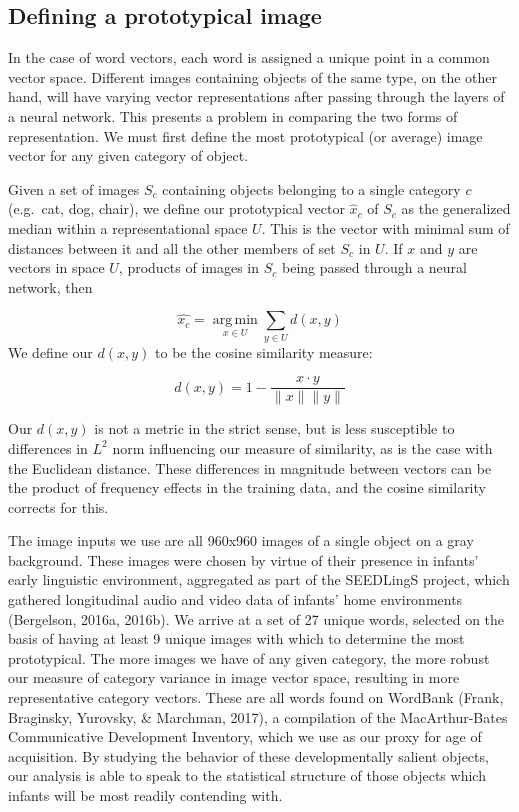 \documentclass[10pt, letterpaper]{article}
\begin{document}
\subsection{Defining a prototypical
image}\label{defining-a-prototypical-image}

In the case of word vectors, each word is assigned a unique point in a
common vector space. Different images containing objects of the same
type, on the other hand, will have varying vector representations after
passing through the layers of a neural network. This presents a problem
in comparing the two forms of representation. We must first define the
most prototypical (or average) image vector for any given category of
object.

Given a set of images \(S_c\) containing objects belonging to a single
category \(c\) (e.g.~cat, dog, chair), we define our prototypical vector
\(\hat{x}_c\) of \(S_c\) as the generalized median within a
representational space \(U\). This is the vector with minimal sum of
distances between it and all the other members of set \(S_c\) in \(U\).
If \(x\) and \(y\) are vectors in space \(U\), products of images in
\(S_c\) being passed through a neural network, then

\[
 \hat{x_c} = \operatorname*{arg\,min}_{x\in U} \sum_{y\in U} d(x, y)
\] We define our \(d(x, y)\) to be the cosine similarity measure:

\[
d(x, y) = 1 - \frac{x\cdot y}{\|x\|\|y\|}
\]

Our \(d(x, y)\) is not a metric in the strict sense, but is less
susceptible to differences in \(L^2\) norm influencing our measure of
similarity, as is the case with the Euclidean distance. These
differences in magnitude between vectors can be the product of frequency
effects in the training data, and the cosine similarity corrects for
this.

The image inputs we use are all 960x960 images of a single object on a
gray background. These images were chosen by virtue of their presence in
infants' early linguistic environment, aggregated as part of the
SEEDLingS project, which gathered longitudinal audio and video data of
infants' home environments (Bergelson, 2016a, 2016b). We arrive at a set
of 27 unique words, selected on the basis of having at least 9 unique
images with which to determine the most prototypical. The more images we
have of any given category, the more robust our measure of category
variance in image vector space, resulting in more representative
category vectors. These are all words found on WordBank (Frank,
Braginsky, Yurovsky, \& Marchman, 2017), a compilation of the
MacArthur-Bates Communicative Development Inventory, which we use as our
proxy for age of acquisition. By studying the behavior of these
developmentally salient objects, our analysis is able to speak to the
statistical structure of those objects which infants will be most
readily contending with.
\end{document}
